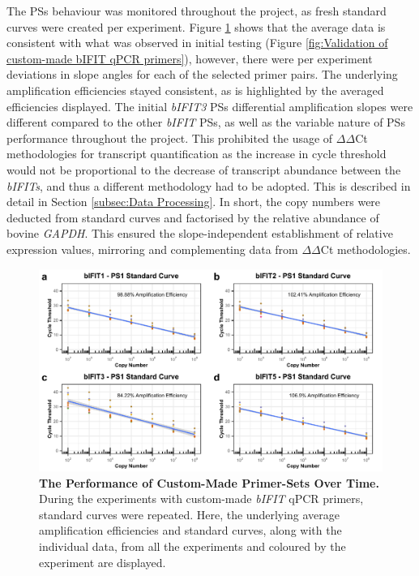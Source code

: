 The PSs behaviour was monitored throughout the project, as fresh standard curves were created per experiment. Figure \ref{fig:The Performance of Custom Made Primer Sets Over Time} shows that the average data is consistent with what was observed in initial testing (Figure \ref{fig:Validation of custom-made bIFIT qPCR primers}), however, there were per experiment deviations in slope angles for each of the selected primer pairs. The underlying amplification efficiencies stayed consistent, as is highlighted by the averaged efficiencies displayed. The initial \textit{bIFIT3} PSs differential amplification slopes were different compared to the other \textit{bIFIT} PSs, as well as the variable nature of PSs performance throughout the project. This prohibited the usage of \(\Delta\)\(\Delta\)Ct methodologies for transcript quantification as the increase in cycle threshold would not be proportional to the decrease of transcript abundance between the \textit{bIFITs}, and thus a different methodology had to be adopted. This is described in detail in Section \ref{subsec:Data Processing}. In short, the copy numbers were deducted from standard curves and factorised by the relative abundance of bovine \textit{GAPDH}. This ensured the slope-independent establishment of relative expression values, mirroring and complementing data from \(\Delta\)\(\Delta\)Ct methodologies.

\begin{figure}
    \centering
    \includegraphics[width=1\linewidth]{07. Chapter 2/Figs/01. Technologies/03. standard curves behaviour.pdf}
    \caption[The Performance of Custom-Made Primer-Sets Over Time.]{\textbf{The Performance of Custom-Made Primer-Sets Over Time.} During the experiments with custom-made \textit{bIFIT} qPCR primers, standard curves were repeated. Here, the underlying average amplification efficiencies and standard curves, along with the individual data, from all the experiments and coloured by the experiment are displayed.}
    \label{fig:The Performance of Custom Made Primer Sets Over Time}
\end{figure}


